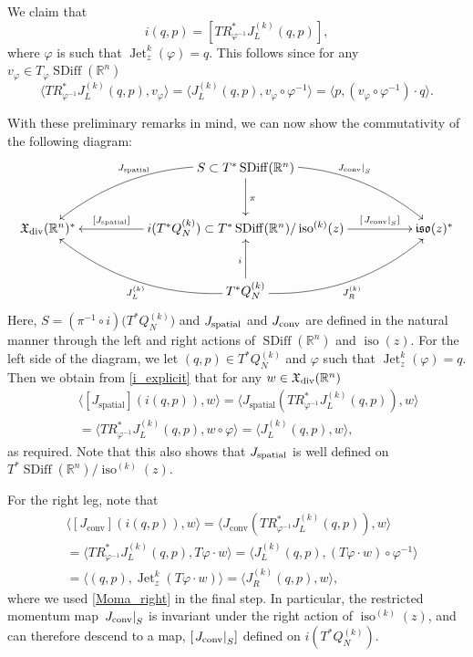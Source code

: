 \documentclass[12pt]{amsart}
\newcommand{\R}{\ensuremath{\mathbb{R}}}
\DeclareMathOperator{\SDiff}{SDiff}
\DeclareMathOperator{\Jet}{Jet}
\DeclareMathOperator{\iso}{iso}
\begin{document}
 We claim that
 \begin{equation}
 	i(q, p) = [TR^*_{\varphi^{-1}} J_L^{(k)}(q, p)], \label{i_explicit}
 \end{equation}
 where $\varphi$ is such that $\Jet_z^k(\varphi) = q$. This follows since for any $v_{\varphi} \in T_{\varphi}\SDiff(\R^n)$
 \begin{equation*}
	\langle TR^*_{\varphi^{-1}} J_L^{(k)}(q, p), v_{\varphi}\rangle = \langle  J_L^{(k)}(q, p), v_\varphi \circ \varphi^{-1}\rangle = \langle p, (v_\varphi \circ \varphi^{-1}) \cdot q \rangle.
 \end{equation*}
 
 
With these preliminary remarks in mind, we can now show the commutativity of the following diagram:
\begin{displaymath}
\xymatrix@R=3em@C=5em{
& \ar@/_1.5pc/[dl]_{J_{\rm spatial}} S \subset T^*\SDiff(\R^n) \ar[d]^{\pi} \ar@/^1.5pc/[dr]^{ \left. J_{\rm conv} \right|_S} & \\
\mathfrak{X}_{\rm div}(\R^n)^* & \ar[l]_-{[J_{\rm spatial}]} i(T^*Q^{(k)}_N) \subset T^*\SDiff(\R^n) / \iso^{(k)}(z) \ar[r]^-{[\left. J_{\rm conv}\right|_{S} ]} & \mathfrak{iso}(z)^* \\
& T^*Q^{(k)}_N \ar[u]^i \ar@/_1.5pc/[ur]_{J_R^{(k)}} \ar@/^1.5pc/[ul]^{J_L^{(k)}} &
}
\end{displaymath}
Here, $S = (\pi^{-1} \circ i)\bigl(T^*Q^{(k)}_N\bigr)$ and $J_{\rm spatial}$ and $J_{\rm conv}$ are defined in the natural manner through the left and right actions of $\SDiff(\R^n)$ and $\iso(z)$.
For the left side of the diagram, we let $(q,p) \in T^*Q^{(k)}_N$ and $\varphi$ such that $\Jet_z^k(\varphi) = q$. Then we obtain from \eqref{i_explicit} that for any $w \in \mathfrak{X}_{\rm div}(\R^n)$
\begin{align*}
	&\langle [J_\text{spatial}](i(q,p)), w\rangle = \langle J_\text{spatial}( TR^*_{\varphi^{-1}} J_L^{(k)}(q, p)), w\rangle \\
	\quad&= \langle TR^*_{\varphi^{-1}} J_L^{(k)}(q, p), w \circ \varphi \rangle
	 = \langle J_L^{(k)}(q, p), w \rangle,
\end{align*}
as required. Note that this also shows that $J_{\rm spatial}$ is well defined on $T^*\SDiff(\R^n) / \iso^{(k)}(z)$. 

For the right leg, note that 
\begin{align*}
	&\langle [J_\text{conv}](i(q,p)), w\rangle = \langle J_\text{conv}( TR^*_{\varphi^{-1}} J_L^{(k)}(q, p)), w\rangle \\
	&= \langle  TR^*_{\varphi^{-1}} J_L^{(k)}(q, p), T\varphi \cdot w \rangle = \langle  J_L^{(k)}(q, p), (T\varphi \cdot w) \circ \varphi^{-1} \rangle \\
	&= \langle (q,p),  \Jet_z^k(T\varphi \cdot w)\rangle = \langle  J^{(k)}_R(q,p), w\rangle,
\end{align*}
where we used \eqref{Moma_right} in the final step. In particular, the restricted momentum map $\left. J_{\rm conv} \right|_S$ is invariant under the right action of $\iso^{(k)}(z)$,
and can therefore descend to a map, $[\left. J_{\rm conv} \right|_S ]$ defined on $i(T^*Q^{(k)}_N)$.
\end{document}
